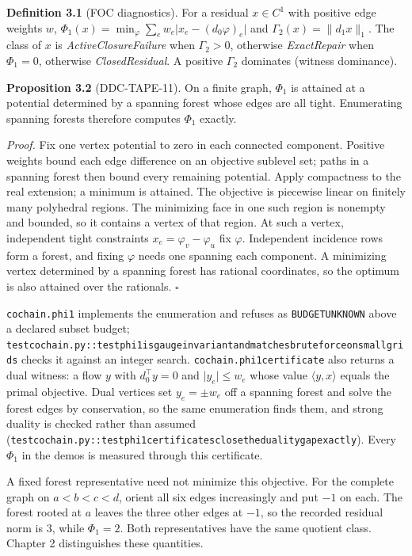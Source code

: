 \documentclass[
  11pt,
]{article}
\renewcommand{\_}{\ddcunderscore\allowbreak}
\begin{document}
\textbf{Definition 3.1} (FOC diagnostics). For a residual \(x \in C^1\)
with positive edge weights \(w\),
\(\Phi_1(x) = \min_{\varphi} \sum_e w_e \lvert x_e - (d_0\varphi)_e \rvert\)
and \(\Gamma_2(x) = \lVert d_1 x \rVert_1\). The class of \(x\) is
\emph{ActiveClosureFailure} when \(\Gamma_2 > 0\), otherwise
\emph{ExactRepair} when \(\Phi_1 = 0\), otherwise \emph{ClosedResidual}.
A positive \(\Gamma_2\) dominates (witness dominance).

\textbf{Proposition 3.2} (DDC-TAPE-11). On a finite graph, \(\Phi_1\) is
attained at a potential determined by a spanning forest whose edges are
all tight. Enumerating spanning forests therefore computes \(\Phi_1\)
exactly.

\emph{Proof.} Fix one vertex potential to zero in each connected
component. Positive weights bound each edge difference on an objective
sublevel set; paths in a spanning forest then bound every remaining
potential. Apply compactness to the real extension; a minimum is
attained. The objective is piecewise linear on finitely many polyhedral
regions. The minimizing face in one such region is nonempty and bounded,
so it contains a vertex of that region. At such a vertex, independent
tight constraints \(x_e = \varphi_v - \varphi_u\) fix \(\varphi\).
Independent incidence rows form a forest, and fixing \(\varphi\) needs
one spanning each component. A minimizing vertex determined by a
spanning forest has rational coordinates, so the optimum is also
attained over the rationals. \(\square\)

\texttt{cochain.\allowbreak phi1} implements the enumeration and refuses as
\texttt{BUDGET\_UNKNOWN} above a declared subset budget;
\texttt{test\_cochain.\allowbreak py::test\_phi1\_is\_gauge\_invariant\_and\_matches\_brute\_force\_on\_small\_grids}
checks it against an integer search. \texttt{cochain.\allowbreak phi1\_certificate}
also returns a dual witness: a flow \(y\) with \(d_0^{\top} y = 0\) and
\(\lvert y_e \rvert \le w_e\) whose value \(\langle y, x \rangle\)
equals the primal objective. Dual vertices set \(y_e = \pm w_e\) off a
spanning forest and solve the forest edges by conservation, so the same
enumeration finds them, and strong duality is checked rather than
assumed
(\texttt{test\_cochain.\allowbreak py::test\_phi1\_certificates\_close\_the\_duality\_gap\_exactly}).
Every \(\Phi_1\) in the demos is measured through this certificate.

A fixed forest representative need not minimize this objective. For the
complete graph on \(a<b<c<d\), orient all six edges increasingly and put
\(-1\) on each. The forest rooted at \(a\) leaves the three other edges
at \(-1\), so the recorded residual norm is 3, while \(\Phi_1=2\). Both
representatives have the same quotient class. Chapter 2 distinguishes
these quantities.
\end{document}
